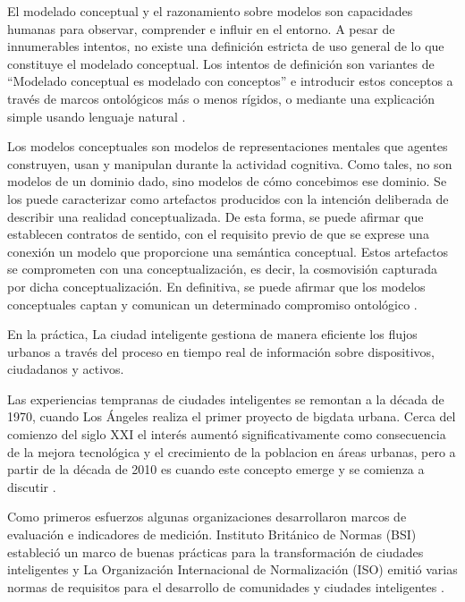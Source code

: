 \documentclass[runningheads,a4paper,spanish]{llncs}
\begin{document}
El modelado conceptual y el razonamiento sobre modelos son capacidades humanas
para observar, comprender e influir en el entorno. A pesar de innumerables
intentos, no existe una definición estricta de uso general de lo que constituye
el modelado conceptual.  Los intentos de definición son variantes de
“Modelado conceptual es modelado con conceptos” e introducir estos conceptos a
través de marcos ontológicos más o menos rígidos, o mediante una explicación
simple usando lenguaje natural \cite{Mawr2020}.

Los modelos conceptuales son modelos de representaciones mentales que agentes
construyen, usan y manipulan durante la actividad cognitiva.  Como tales, no
son modelos de un dominio dado, sino modelos de cómo concebimos ese dominio. Se
los puede caracterizar como artefactos producidos con la intención deliberada
de describir una realidad conceptualizada. De esta forma, se puede afirmar que
establecen contratos de sentido, con el requisito previo de que se exprese una
conexión un modelo que proporcione una semántica conceptual. Estos artefactos
se comprometen con una conceptualización, es decir, la cosmovisión capturada
por dicha conceptualización. En definitiva, se puede afirmar que los modelos
conceptuales captan y comunican un determinado compromiso ontológico
\cite{Guarino2020}.

En la práctica,
La ciudad inteligente
gestiona de manera eficiente los flujos urbanos
a través del proceso en tiempo real de información
sobre dispositivos, ciudadanos y activos. 

Las experiencias tempranas de ciudades inteligentes se remontan a la década de
1970, cuando Los Ángeles realiza el primer proyecto de bigdata urbana. Cerca
del comienzo del siglo XXI el interés aumentó significativamente como
consecuencia de la mejora tecnológica y el crecimiento de la poblacion en áreas
urbanas, pero a partir de la década de 2010 es cuando este concepto emerge y se
comienza a discutir \cite{stubinger_understanding_2020}.

Como primeros esfuerzos algunas organizaciones desarrollaron marcos de
evaluación e indicadores de medición. Instituto Británico de Normas (BSI)
estableció un marco de buenas prácticas para la transformación de ciudades
inteligentes y La Organización Internacional de Normalización (ISO) emitió
varias normas de requisitos para el desarrollo de comunidades y ciudades
inteligentes \cite{aljowder_systematic_2019}.
\end{document}
